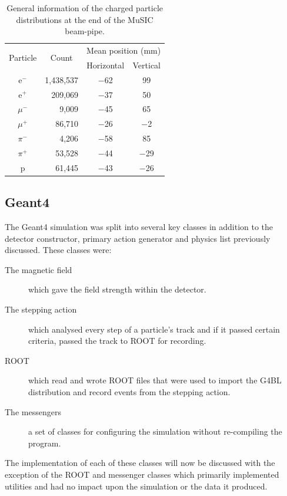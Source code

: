 \begin{table}
  \begin{center}
  \begin{tabular}{c | r | c | c}
    \multicolumn{1}{c|}{\multirow{2}{*}{Particle}} 
               &  \multicolumn{1}{c|}{\multirow{2}{*}{Count}} 
                             &  \multicolumn{2}{c}{Mean position (mm)}    \\
               &             &  Horizontal  &  Vertical \\
    \hline
      e\(^-\)  &  1,438,537  &    \(-\)62   &       99  \\
      e\(^+\)  &    209,069  &    \(-\)37   &       50  \\
    \(\mu^-\)  &      9,009  &    \(-\)45   &       65  \\
    \(\mu^+\)  &     86,710  &    \(-\)26   &   \(-\)2  \\
    \(\pi^-\)  &      4,206  &    \(-\)58   &       85  \\
    \(\pi^+\)  &     53,528  &    \(-\)44   &  \(-\)29  \\
       p       &     61,445  &    \(-\)43   &  \(-\)26  \\
  \end{tabular}
  \end{center}
  \caption{General information of the charged particle distributions at the end of the MuSIC beam-pipe.}
  \label{tab:g4bl_particle_counts}
\end{table}

\subsection{Geant4} %
\label{sub:geant4}
The Geant4 simulation was split into several key classes in addition to the detector constructor, primary action generator and physics list previously discussed. These classes were:
\begin{description}
  \item[The magnetic field] which gave the field strength within the detector.
  \item[The stepping action] which analysed every step of a particle's track and if it passed certain criteria, passed the track to ROOT for recording.
  \item[ROOT] which read and wrote ROOT files that were used to import the G4BL distribution and record events from the stepping action.
  \item[The messengers] a set of classes for configuring the simulation without re-compiling the program.
\end{description}
The implementation of each of these classes will now be discussed with the exception of the ROOT and messenger classes which primarily implemented utilities and had no impact upon the simulation or the data it produced.

